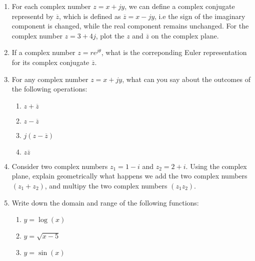 \documentclass[9pt]{article}
\begin{document}
\begin{multicols}{2}
\begin{enumerate}
        \item For each complex number $z = x + jy$, we can define a complex conjugate representd by $\overline{z}$, which is defined as $\overline{z} = x -jy$, i.e the sign of the imaginary component is changed, while the real component remains unchanged. For the complex number $z = 3 + 4j$, plot the $z$ and $\overline{z}$ on the complex plane.

        \item If a complex number $z = re^{j\theta}$, what is the correponding Euler representation for its complex conjugate $\overline{z}$.

        \item For any complex number $z = x + jy$, what can you say about the outcomes of the following operations:
        \begin{enumerate}
            \item $z + \overline{z}$
            \item $z - \overline{z}$
            \item $j(z - \overline{z})$
            \item $z\overline{z}$
        \end{enumerate}

        \item Consider two complex numbers $z_1 = 1 - i$ and $z_2 = 2 + i$. Using the complex plane, explain geometrically what happens we add the two complex numbers $\left(z_1 + z_2\right)$, and multipy the two complex numbers $\left(z_1z_2\right)$.

        \item  Write down the domain and range of the following functions:
        \begin{enumerate}
            \item $y = \log\left(x\right)$
            \item $y = \sqrt{x - 5}$
            \item $y = \sin\left(x\right)$
        \end{enumerate}
    \end{enumerate}
    \vfill
\end{multicols}
\end{document}
